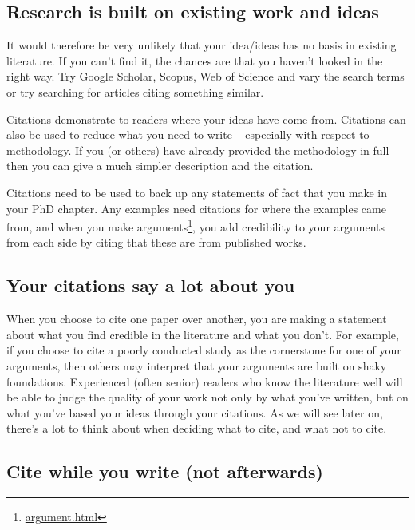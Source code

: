 \documentclass[
]{krantz}
\renewcommand{\href}[2]{#2\footnote{\url{#1}}}
\begin{document}
\hypertarget{research-is-built-on-existing-work-and-ideas}{%
\subsection{Research is built on existing work and ideas}\label{research-is-built-on-existing-work-and-ideas}}

It would therefore be very unlikely that your idea/ideas has no basis in existing literature. If you can't find it, the chances are that you haven't looked in the right way. Try Google Scholar, Scopus, Web of Science and vary the search terms or try searching for articles citing something similar.

Citations demonstrate to readers where your ideas have come from. Citations can also be used to reduce what you need to write -- especially with respect to methodology. If you (or others) have already provided the methodology in full then you can give a much simpler description and the citation.

Citations need to be used to back up any statements of fact that you make in your PhD chapter. Any examples need citations for where the examples came from, and when you make \href{argument.html}{arguments}, you add credibility to your arguments from each side by citing that these are from published works.

\hypertarget{your-citations-say-a-lot-about-you}{%
\subsection{Your citations say a lot about you}\label{your-citations-say-a-lot-about-you}}

When you choose to cite one paper over another, you are making a statement about what you find credible in the literature and what you don't. For example, if you choose to cite a poorly conducted study as the cornerstone for one of your arguments, then others may interpret that your arguments are built on shaky foundations. Experienced (often senior) readers who know the literature well will be able to judge the quality of your work not only by what you've written, but on what you've based your ideas through your citations. As we will see later on, there's a lot to think about when deciding what to cite, and what not to cite.

\hypertarget{cite-while-you-write-not-afterwards}{%
\subsection{Cite while you write (not afterwards)}\label{cite-while-you-write-not-afterwards}}
\end{document}
